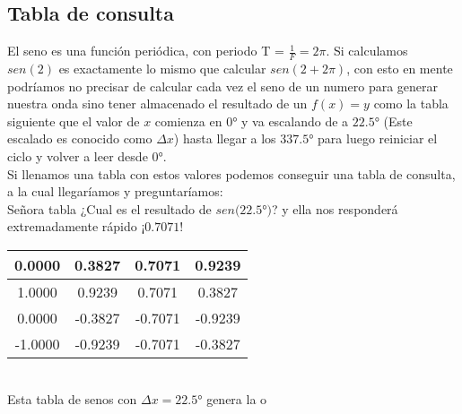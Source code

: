 \documentclass[]{article}
\begin{document}
\subsection*{Tabla de consulta}
El seno es una función periódica, con periodo T = $\frac{1}{F} = 2\pi$. Si calculamos $sen(2)$ es exactamente lo mismo que calcular $sen(2+2\pi)$, con esto en mente podríamos no precisar de calcular cada vez el seno de un numero para generar nuestra onda sino tener almacenado el resultado de un $f(x)=y$ como la tabla siguiente que el valor de $x$ comienza en $0$° y va escalando de a $22.5$° (Este escalado es conocido como $\Delta x$) hasta llegar a los $337.5$° para luego reiniciar el ciclo y volver a leer desde $0$°.\\
Si llenamos una tabla con estos valores podemos conseguir una tabla de consulta, a la cual llegaríamos y preguntaríamos: \\
Señora tabla ¿Cual es el resultado de $sen(22.5$°$)$? y ella nos responderá extremadamente rápido ¡$0.7071$!
\begin{table}[h!]
	\begin{tabular}{|c|c|c|c|} 
		\hline
		 0.0000 & 0.3827 & 0.7071 & 0.9239 \\ \hline
	     1.0000 & 0.9239 & 0.7071 & 0.3827 \\ \hline
		 0.0000 &-0.3827 &-0.7071 &-0.9239 \\ \hline
		-1.0000 &-0.9239 &-0.7071 &-0.3827  \\\hline
	\end{tabular}
\end{table}\\
Esta tabla de senos con $\Delta x = 22.5$° genera la o\\
\end{document}

